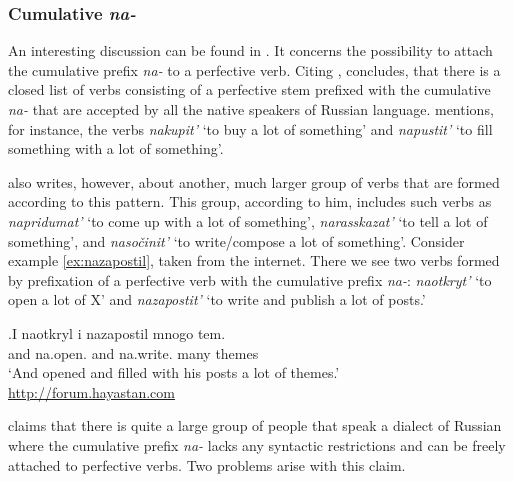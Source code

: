 \subsubsection{Cumulative \textit{na-}}
An interesting discussion can be found in \citet{Tatevosov:13a}. It concerns the possibility to attach the cumulative prefix \textit{na-} to a perfective verb. Citing \citet{Zaliznjak:03}, \citet{Tatevosov:13a} concludes, that there is a closed list of verbs consisting of a perfective stem prefixed with the cumulative \textit{na-} that are accepted by all the native speakers of Russian language. \citet{Tatevosov:13a} mentions, for instance, the verbs \textit{nakupit'}\textsuperscript{\PF} `to buy a lot of something' and \textit{napustit'}\textsuperscript{\PF} `to fill something with a lot of something'. 

\citeauthor{Tatevosov:13a} also writes, however, about another, much larger group of verbs that are formed according to this pattern. This group, according to him, includes such verbs as \textit{napridumat'}\textsuperscript{\PF} `to come up with a lot of something', \textit{narasskazat'}\textsuperscript{\PF} `to tell a lot of something', and \textit{naso\v{c}init'}\textsuperscript{\PF} `to write/compose a lot of something'. Consider example \ref{ex:nazapostil}, taken from the internet. There we see two verbs formed by prefixation of a perfective verb with the cumulative prefix \textit{na-}: \textit{naotkryt'} `to open a lot of X' and \textit{nazapostit'} `to write and publish a lot of posts.'
 
\exg.\label{ex:nazapostil}I naotkryl i nazapostil mnogo tem.\\
and na.open. and {na.write.} {many} {themes}\\
\trans `And opened and filled with his posts a lot of themes.'\\\hbox{}\hfill\hbox{\url{http://forum.hayastan.com}}

\citet{Tatevosov:13a} claims that there is quite a large group of people that speak a dialect of Russian where the cumulative prefix \textit{na-} lacks any syntactic restrictions and can be freely attached to perfective verbs. Two problems arise with this claim.

